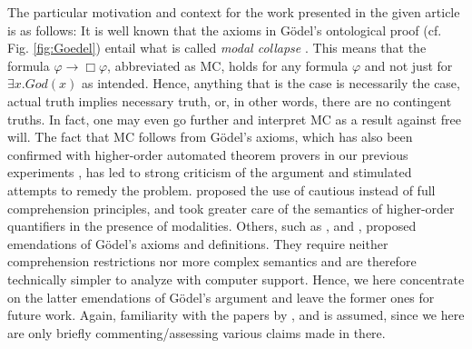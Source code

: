 \documentclass{birkjour}
\theoremstyle{definition}
\theoremstyle{remark}
\numberwithin{equation}{section}
\begin{document}
The particular motivation and context for the work presented in the given
article is as follows: It is well known that the axioms in G\"odel's
ontological proof (cf. Fig. \ref{fig:Goedel}) entail what is called
\emph{modal collapse} \citep{Sobel1987,SobelBook2004}. This means that
the formula $\varphi \rightarrow \Box \varphi$, abbreviated as MC,
holds for any formula $\varphi$ and not just for
$\exists x. \mathit{God}(x)$ as intended.  Hence, anything that is the case is necessarily the case, actual truth implies necessary truth, or, in other words, there are no
contingent truths. In fact, one may even go further and interpret MC as a result
against free will.
%
The fact that MC follows from Gödel's axioms, which has also been
confirmed with higher-order automated theorem provers in our previous
experiments \citep{C40,J30}, has led to strong criticism of the
argument and stimulated attempts to remedy the problem.
\citet{Hajek_Magari_and_others_1996,Hajek_der_Mathematiker_2001}
proposed the use of cautious instead of full comprehension principles,
and \citet{fitting02:_types_tableaus_god} took greater care of the
semantics of higher-order quantifiers in the presence of
modalities. Others, such as
\citet{anderson90:_some_emend_of_goedel_ontol_proof},
\citet{Hajek2002} and \citet{bjordal99}, proposed emendations of
G\"odel's axioms and definitions. They require neither comprehension
restrictions nor more complex semantics and are therefore technically
simpler to analyze with computer support. Hence, we here concentrate
on the latter emendations of Gödel's argument and leave the former
ones for future work.  Again, familiarity with the papers by
\citet{anderson90:_some_emend_of_goedel_ontol_proof},
\citet{Hajek2002} and \citet{bjordal99} is assumed, since we here are only
briefly commenting/assessing various claims made in there.
\end{document}
